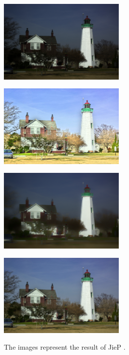 \begin{figure}[t]
	\begin{minipage}[b]{0.5\hsize}
		\centering
		\includegraphics[width=62.5mm]{images/jiep/input.eps}
		 \label{fig:jiep/input}
	\end{minipage}
	\begin{minipage}[b]{0.5\hsize}
		\centering
		\includegraphics[width=62.5mm]{images/jiep/reflectance.eps}
		 \label{fig:jiep/reflectance}
	\end{minipage}
	\begin{minipage}[b]{0.5\hsize}
		\centering
		\includegraphics[width=62.5mm]{images/jiep/illumination.eps}
		 \label{fig:jiep/illumination}
	\end{minipage}
	\begin{minipage}[b]{0.5\hsize}
		\centering
		\includegraphics[width=62.5mm]{images/jiep/output.eps}
		 \label{fig:jiep/output}
	\end{minipage}
	\caption{The images represent the result of JieP \cite{jiep}.}
	\label{fig:jiep/example}
\end{figure}

